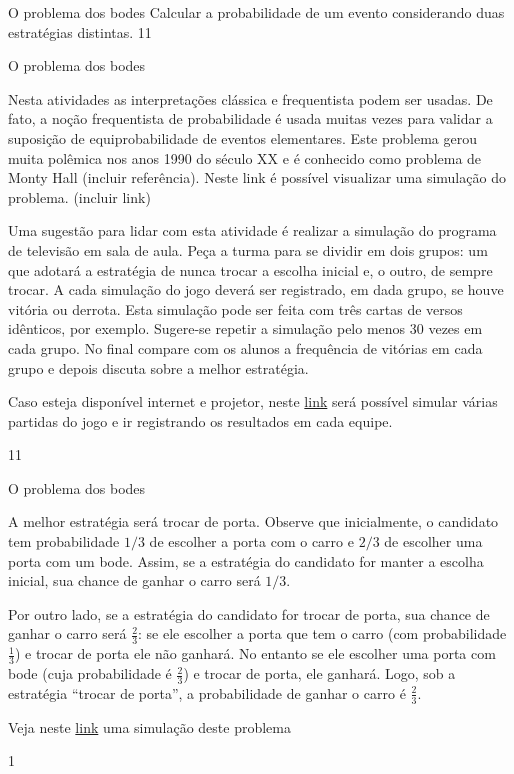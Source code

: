 \clearpage
\def\currentcolor{session2}
\begin{objectives}{O problema dos bodes}
{
Calcular a probabilidade de um evento considerando duas estratégias distintas.
}{1}{1}
\end{objectives}
\begin{sugestions}{O problema dos bodes}
{
Nesta atividades as interpretações clássica e frequentista podem ser usadas. De fato, a noção frequentista de probabilidade é usada muitas vezes para validar a suposição de equiprobabilidade de eventos elementares. Este problema gerou muita polêmica nos anos 1990 do século XX e é conhecido como problema de Monty Hall (incluir referência). Neste link é possível visualizar uma simulação do problema. (incluir link)

Uma sugestão para lidar com esta atividade é realizar a simulação do programa de televisão em sala de aula. Peça a turma para se dividir em dois grupos: um que adotará a estratégia de nunca trocar a escolha inicial e, o outro, de sempre trocar. A cada simulação do jogo deverá ser registrado, em dada grupo, se houve vitória ou derrota. Esta simulação pode ser feita com três cartas de versos idênticos, por exemplo. Sugere-se repetir a simulação pelo menos 30 vezes em cada grupo. No final compare com os alunos a frequência de vitórias em cada grupo e depois discuta sobre a melhor estratégia.

Caso esteja disponível internet e projetor, neste \href{https://www.geogebra.org/m/Ec9xubPJ}{link} será possível simular várias partidas do jogo e ir registrando os resultados em cada equipe.
}{1}{1}
\end{sugestions}
\begin{answer}{O problema dos bodes}
{
A melhor estratégia será trocar de porta. Observe que inicialmente, o candidato tem probabilidade $1/3$ de escolher a porta com o carro e $2/3$ de escolher uma porta com um bode. Assim, se a estratégia do candidato for manter a escolha inicial, sua chance de ganhar o carro será $1/3$.

Por outro lado, se a estratégia do candidato for trocar de porta, sua chance de ganhar o carro será $\frac{2}{3}$: se ele escolher a porta que tem o carro (com probabilidade $\frac{1}{3}$) e trocar de porta ele não ganhará. No entanto se ele escolher uma porta com bode (cuja probabilidade é $\frac{2}{3}$) e trocar de porta, ele ganhará. Logo, sob a estratégia “trocar de porta”, a probabilidade de ganhar o carro é $\frac{2}{3}$.

Veja neste \href{https://www.geogebra.org/m/Ec9xubPJ}{link} uma simulação deste problema
}{1}
\end{answer}

